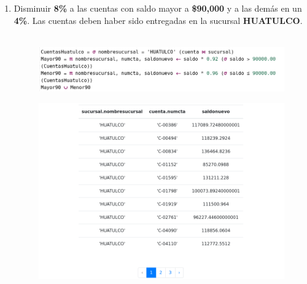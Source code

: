 \documentclass{exam}
\begin{document}
\begin{questions}
\begin{enumerate}[label=\alph*.]
		
		\newpage
		\item Disminuir \textbf{8\%} a las cuentas con saldo mayor a \textbf{\$90,000} y a las demás en un \textbf{4\%}. Las cuentas deben haber sido
entregadas en la sucursal \textbf{HUATULCO}.\\\\
		\begin{center}
		\begin{figure}[h!]
			\includegraphics[width=16cm]{imgs/e1.png}
			\centering
		\end{figure}	
		\end{center}
		\begin{center}
		\begin{figure}[h!]
			\includegraphics[width=16cm]{imgs/e2.png}
			\centering
		\end{figure}	
		\end{center}
	\end{enumerate}
	
	
\end{questions}
\end{document}
